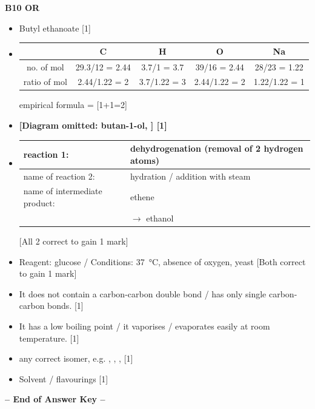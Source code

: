 \documentclass[11pt]{exam}
\begin{document}
\textbf{B10 OR}
\begin{itemize}
\item[(a)] Butyl ethanoate [1]

\item[(b)(i)]
\begin{tabular}{|c|c|c|c|c|}
\hline
 & C & H & O & Na \\
\hline
no. of mol & 29.3/12 = 2.44 & 3.7/1 = 3.7 & 39/16 = 2.44 & 28/23 = 1.22 \\
\hline
ratio of mol & 2.44/1.22 = 2 & 3.7/1.22 = 3 & 2.44/1.22 = 2 & 1.22/1.22 = 1 \\
\hline
\end{tabular}

empirical formula =  [1+1=2]

\item[(b)(ii)] \textbf{[Diagram omitted: butan-1-ol, ] [1]}

\item[(c)(i)]
\begin{tabular}{|l|l|}
\hline
reaction 1: & dehydrogenation (removal of 2 hydrogen atoms) \\
\hline
name of reaction 2: & hydration / addition with steam \\
\hline
name of intermediate product: & ethene \\
\hline
 & $\rightarrow$ ethanol \\
\hline
\end{tabular}
\hfill [All 2 correct to gain 1 mark]

\item[(c)(ii)] Reagent: glucose /  \hfill Conditions: \qty{37}{\celsius}, absence of oxygen, yeast \hfill [Both correct to gain 1 mark]

\item[(d)] It does not contain a carbon-carbon double bond / has only single carbon-carbon bonds. [1]

\item[(e)(i)] It has a low boiling point / it vaporises / evaporates easily at room temperature. [1]

\item[(e)(ii)] any correct isomer, e.g. , , ,  [1]

\item[(e)(iii)] Solvent / flavourings [1]
\end{itemize}

\vfill
\begin{center}
\textbf{-- End of Answer Key --}
\end{center}
\end{document}
